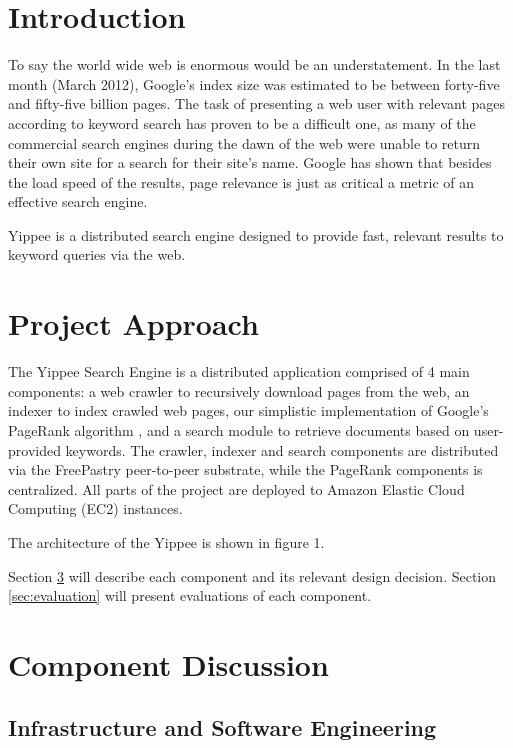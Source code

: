 \documentclass[11pt, letterpaper, oneside, twocolumn]{article}
\begin{document}
\section{ Introduction }

To say the world wide web is enormous would be an understatement.  
In the last month (March 2012),  Google's index size was estimated to be between forty-five and fifty-five billion pages.\cite{websize}
The task of presenting a web user with relevant pages according to keyword search has proven to be a difficult one, as many of the commercial search engines during the dawn of the web were unable to return their own site for a search for their site's name.\cite{google} 
Google has shown that besides the load speed of the results, page relevance is just as critical a metric of an effective search engine. 

Yippee is a distributed search engine designed to provide fast, relevant results to keyword queries via the web.  

\section{Project Approach}
\label{sec:approach}

The Yippee Search Engine is a distributed application comprised of 4 main components: a web crawler to recursively download pages from the web, an indexer to index crawled web pages, our simplistic implementation of Google's PageRank algorithm \cite{pagerank}, and a search module to retrieve documents based on user-provided keywords.  
The crawler, indexer and search components are distributed via the FreePastry peer-to-peer substrate, while the PageRank components is centralized.  All parts of the project are deployed to Amazon Elastic Cloud Computing (EC2) instances.  

The architecture of the Yippee is shown in figure 1.



Section \ref{sec:component} will describe each component and its relevant design decision.
Section \ref{sec:evaluation} will present evaluations of each component.

\section{Component Discussion}
\label{sec:component}

\subsection{Infrastructure and Software Engineering}
\end{document}
